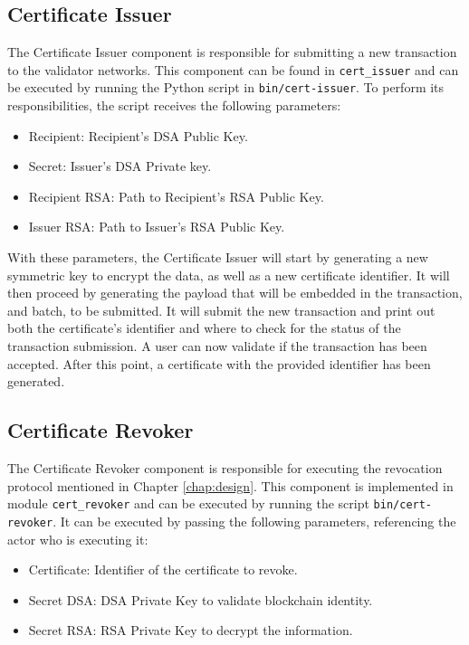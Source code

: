 \subsection{Certificate Issuer}

The Certificate Issuer component is responsible for submitting a new transaction to the validator networks. This component can be found in \texttt{cert\_issuer} and can be executed by running the Python script in \texttt{bin/cert-issuer}. To perform its responsibilities, the script receives the following parameters:

\begin{itemize}
	\item Recipient: Recipient's DSA Public Key.
	\item Secret: Issuer's DSA Private key.
	\item Recipient RSA: Path to Recipient's RSA Public Key.
	\item Issuer RSA: Path to Issuer's RSA Public Key.
\end{itemize}

With these parameters, the Certificate Issuer will start by generating a new symmetric key to encrypt the data, as well as a new certificate identifier. It will then proceed by generating the payload that will be embedded in the transaction, and batch, to be submitted. It will submit the new transaction and print out both the certificate's identifier and where to check for the status of the transaction submission. A user can now validate if the transaction has been accepted. After this point, a certificate with the provided identifier has been generated.

\subsection{Certificate Revoker}

The Certificate Revoker component is responsible for executing the revocation protocol mentioned in Chapter \ref{chap:design}. This component is implemented in module \texttt{cert\_revoker} and can be executed by running the script \texttt{bin/cert-revoker}. It can be executed by passing the following parameters, referencing the actor who is executing it:

\begin{itemize}
	\item Certificate: Identifier of the certificate to revoke.
	\item Secret DSA: DSA Private Key to validate blockchain identity.
	\item Secret RSA: RSA Private Key to decrypt the information.
\end{itemize}

